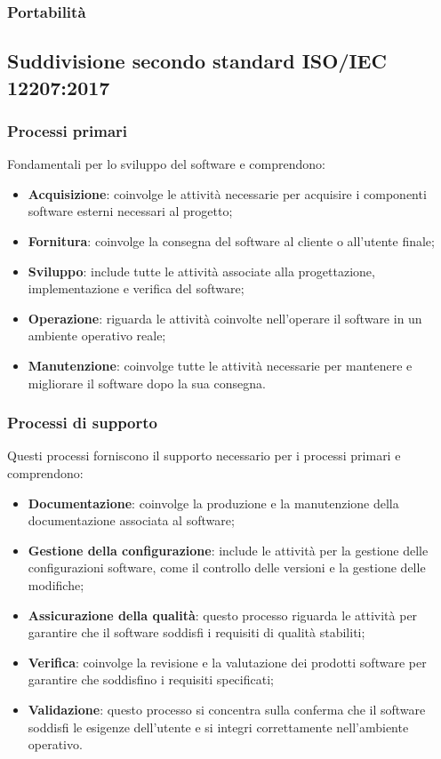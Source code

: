 \subsubsection{Portabilità}
\subsection{Suddivisione secondo standard ISO/IEC 12207:2017}
\subsubsection{Processi primari}
Fondamentali per lo sviluppo del software e comprendono:
\begin{itemize}
    \item \textbf{Acquisizione}: coinvolge le attività necessarie per acquisire i componenti software esterni necessari al progetto;
    \item \textbf{Fornitura}: coinvolge la consegna del software al cliente o all'utente finale;
    \item \textbf{Sviluppo}: include tutte le attività associate alla progettazione, implementazione e verifica del software;
    \item \textbf{Operazione}: riguarda le attività coinvolte nell'operare il software in un ambiente operativo reale;
    \item \textbf{Manutenzione}: coinvolge tutte le attività necessarie per mantenere e migliorare il software dopo la sua consegna.
\end{itemize}
\subsubsection{Processi di supporto}
Questi processi forniscono il supporto necessario per i processi primari e comprendono:
\begin{itemize}
    \item \textbf{Documentazione}: coinvolge la produzione e la manutenzione della documentazione associata al software;
    \item \textbf{Gestione della configurazione}: include le attività per la gestione delle configurazioni software, come il controllo delle versioni e la gestione delle modifiche;
    \item \textbf{Assicurazione della qualità}: questo processo riguarda le attività per garantire che il software soddisfi i requisiti di qualità stabiliti;
    \item \textbf{Verifica}: coinvolge la revisione e la valutazione dei prodotti software per garantire che soddisfino i requisiti specificati;
    \item \textbf{Validazione}: questo processo si concentra sulla conferma che il software soddisfi le esigenze dell'utente e si integri correttamente nell'ambiente operativo.
\end{itemize}
